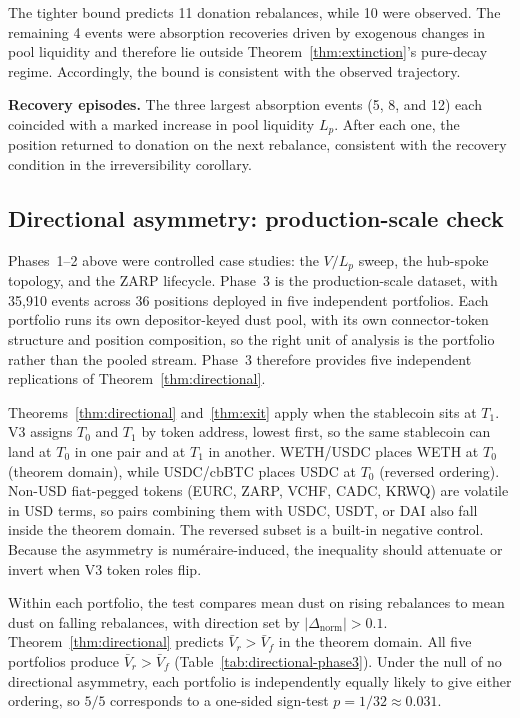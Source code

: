 \documentclass{manuscript}
\begin{document}
The tighter bound predicts 11 donation rebalances, while 10 were observed. The remaining 4 events were absorption recoveries driven by exogenous changes in pool liquidity and therefore lie outside Theorem~\ref{thm:extinction}'s pure-decay regime. Accordingly, the bound is consistent with the observed trajectory.

\textbf{Recovery episodes.} The three largest absorption events (5, 8, and 12) each coincided with a marked increase in pool liquidity $L_p$. After each one, the position returned to donation on the next rebalance, consistent with the recovery condition in the irreversibility corollary.

\subsection{Directional asymmetry: production-scale check}\label{sec:directional-empirical}

Phases~1--2 above were controlled case studies: the $V/L_p$ sweep, the hub-spoke topology, and the ZARP lifecycle. Phase~3 is the production-scale dataset, with 35{,}910 events across 36 positions deployed in five independent portfolios. Each portfolio runs its own depositor-keyed dust pool, with its own connector-token structure and position composition, so the right unit of analysis is the portfolio rather than the pooled stream. Phase~3 therefore provides five independent replications of Theorem~\ref{thm:directional}.

Theorems~\ref{thm:directional} and~\ref{thm:exit} apply when the stablecoin sits at $T_1$. V3 assigns $T_0$ and $T_1$ by token address, lowest first, so the same stablecoin can land at $T_0$ in one pair and at $T_1$ in another. WETH/USDC places WETH at $T_0$ (theorem domain), while USDC/cbBTC places USDC at $T_0$ (reversed ordering). Non-USD fiat-pegged tokens (EURC, ZARP, VCHF, CADC, KRWQ) are volatile in USD terms, so pairs combining them with USDC, USDT, or DAI also fall inside the theorem domain. The reversed subset is a built-in negative control. Because the asymmetry is numéraire-induced, the inequality should attenuate or invert when V3 token roles flip.

Within each portfolio, the test compares mean dust on rising rebalances to mean dust on falling rebalances, with direction set by $|\Delta_{\mathrm{norm}}| > 0.1$. Theorem~\ref{thm:directional} predicts $\bar V_r > \bar V_f$ in the theorem domain. All five portfolios produce $\bar V_r > \bar V_f$ (Table~\ref{tab:directional-phase3}). Under the null of no directional asymmetry, each portfolio is independently equally likely to give either ordering, so $5/5$ corresponds to a one-sided sign-test $p = 1/32 \approx 0.031$.
\end{document}
